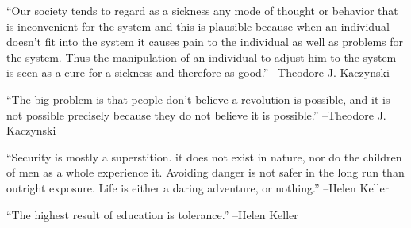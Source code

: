 \documentclass{article}%
\begin{document}
\linebreak%
\vspace{1mm}%
\begin{minipage}{\textwidth}%
\flushleft%
“Our society tends to regard as a sickness any mode of thought or behavior that is inconvenient for the system and this is plausible because when an individual doesn't fit into the system it causes pain to the individual as well as problems for the system. Thus the manipulation of an individual to adjust him to the system is seen as a cure for a sickness and therefore as good.”%
\linebreak%
\vspace{1mm}%
–Theodore J. Kaczynski%
\linebreak%
\vspace{1mm}%
\end{minipage}%
\linebreak%
\vspace{1mm}%
\begin{minipage}{\textwidth}%
\flushleft%
“The big problem is that people don't believe a revolution is possible, and it is not possible precisely because they do not believe it is possible.”%
\linebreak%
\vspace{1mm}%
–Theodore J. Kaczynski%
\linebreak%
\vspace{1mm}%
\end{minipage}%
\linebreak%
\vspace{1mm}%
\begin{minipage}{\textwidth}%
\flushleft%
“Security is mostly a superstition. it does not exist in nature, nor do the children of men as a whole experience it. Avoiding danger is not safer in the long run than outright exposure. Life is either a daring adventure, or nothing.”%
\linebreak%
\vspace{1mm}%
–Helen Keller%
\linebreak%
\vspace{1mm}%
\end{minipage}%
\linebreak%
\vspace{1mm}%
\begin{minipage}{\textwidth}%
\flushleft%
“The highest result of education is tolerance.”%
\linebreak%
\vspace{1mm}%
–Helen Keller%
\linebreak%
\vspace{1mm}%
\end{minipage}%
\end{document}
